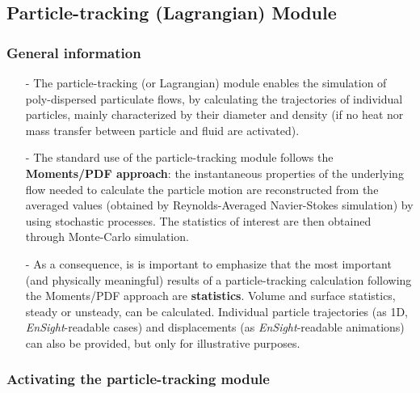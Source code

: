 {{%
\subsection{Particle-tracking (Lagrangian) Module}

\subsubsection{General information}\label{sec:over-lag}

\begin{itemize}

\item[-] The particle-tracking (or Lagrangian) module enables the simulation of poly-dispersed particulate flows, by calculating the trajectories of individual particles, mainly characterized by their diameter and density (if no heat nor mass transfer between particle and fluid are activated).

\item[-] The standard use of the particle-tracking module follows the \textbf{Moments/PDF approach}: the instantaneous properties of the underlying flow needed to calculate the particle motion are reconstructed from the averaged values (obtained by Reynolds-Averaged Navier-Stokes simulation) by using stochastic processes. The statistics of interest are then obtained through Monte-Carlo simulation.

\item[-] As a consequence, is is important to emphasize that the most important (and physically meaningful) results of a particle-tracking calculation following the Moments/PDF approach are \mbox{\textbf{statistics}}. Volume and surface statistics, steady or unsteady, can be calculated. Individual particle trajectories (as 1D, \textit{EnSight}-readable cases) and displacements (as \textit{EnSight}-readable animations) can also be provided, but only for illustrative purposes.

\end{itemize}

\subsubsection{Activating the particle-tracking module}\label{sec:acti-lag}

}}
